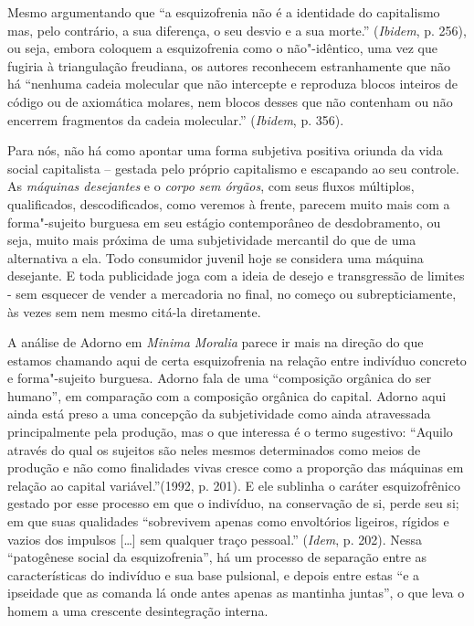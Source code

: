 Mesmo argumentando que ``a esquizofrenia não é a identidade do
capitalismo mas, pelo contrário, a sua diferença, o seu desvio e a sua
morte.'' (\emph{Ibidem}, p. 256), ou seja, embora coloquem a esquizofrenia
como o não"-idêntico, uma vez que fugiria à triangulação freudiana, os
autores reconhecem estranhamente que não há ``nenhuma cadeia molecular
que não intercepte e reproduza blocos inteiros de código ou de
axiomática molares, nem blocos desses que não contenham ou não encerrem
fragmentos da cadeia molecular.'' (\emph{Ibidem}, p. 356).

Para nós, não há como apontar uma forma subjetiva positiva oriunda da
vida social capitalista -- gestada pelo próprio capitalismo e escapando
ao seu controle. As \emph{máquinas desejantes} e o \emph{corpo sem
órgãos}, com seus fluxos múltiplos, qualificados, descodificados, como
veremos à frente, parecem muito mais com a forma"-sujeito burguesa em seu
estágio contemporâneo de desdobramento, ou seja, muito mais próxima de
uma subjetividade mercantil do que de uma alternativa a ela. Todo consumidor
juvenil hoje se considera uma máquina desejante. E toda publicidade joga
com a ideia de desejo e transgressão de limites - sem esquecer de vender
a mercadoria no final, no começo ou subrepticiamente, às vezes sem nem
mesmo citá-la diretamente.

A análise de Adorno em \emph{Minima Moralia} parece ir mais na direção
do que estamos chamando aqui de certa esquizofrenia na relação entre
indivíduo concreto e forma"-sujeito burguesa. Adorno fala de uma
``composição orgânica do ser humano'', em comparação com a composição
orgânica do capital. Adorno aqui ainda está preso a uma concepção da
subjetividade como ainda atravessada principalmente pela produção, mas o
que interessa é o termo sugestivo: ``Aquilo através do qual os sujeitos
são neles mesmos determinados como meios de produção e não como
finalidades vivas cresce como a proporção das máquinas em relação ao
capital variável.''(1992, p. 201). E ele sublinha o caráter
esquizofrênico gestado por esse processo em que o indivíduo, na
conservação de si, perde seu si; em que suas qualidades ``sobrevivem
apenas como envoltórios ligeiros, rígidos e vazios dos impulsos
[\ldots{}] sem qualquer traço pessoal.'' (\emph{Idem}, p. 202).
Nessa ``patogênese social da esquizofrenia'', há um processo de
separação entre as características do indivíduo e sua base pulsional, e
depois entre estas ``e a ipseidade que as comanda lá onde antes apenas
as mantinha juntas'', o que leva o homem a uma crescente desintegração
interna.

